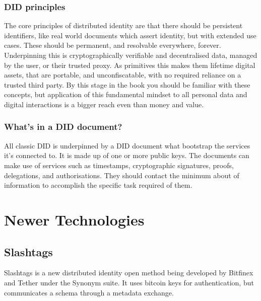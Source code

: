 \subsubsection{DID principles}
The core principles of distributed identity are that there should be persistent identifiers, like real world documents which assert identity, but with extended use cases. These should be permanent, and resolvable everywhere, forever. Underpinning this is cryptographically verifiable and decentralised data, managed by the user, or their trusted proxy. As primitives this makes them lifetime digital assets, that are portable, and unconfiscatable, with no required reliance on a trusted third party. By this stage in the book you should be familiar with these concepts, but application of this fundamental mindset to all personal data and digital interactions is a bigger reach even than money and value.
\subsubsection{What's in a DID document?}
All classic DID is underpinned by a DID document what bootstrap the services it's connected to. It is made up of one or more public keys. The documents can make use of services such as timestamps, cryptographic signatures, proofs, delegations, and authorisations. They should contact the minimum about of information to accomplish the specific task required of them.

\section{Newer Technologies}
\subsection{Slashtags}
Slashtags is a new distributed identity open method being developed by Bitfinex and Tether under the Synonym suite. It uses bitcoin keys for authentication, but communicates a schema through a metadata exchange.
